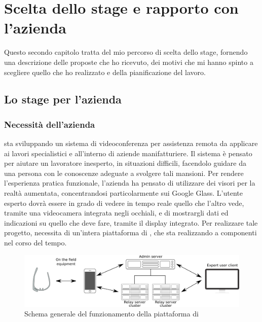 \chapter{Scelta dello stage e rapporto con l'azienda}
Questo secondo capitolo tratta del mio percorso di scelta dello stage, fornendo una descrizione delle proposte che ho ricevuto, dei motivi che mi hanno spinto a scegliere quello che ho realizzato e della pianificazione del lavoro.

\section{Lo stage per l'azienda}

   \subsection{Necessità dell'azienda}
   \nomeAzienda{} sta sviluppando un sistema di videoconferenza per assistenza remota da applicare ai lavori specialistici e all'interno di aziende manifatturiere. Il sistema è pensato per aiutare un lavoratore inesperto, in situazioni difficili, facendolo guidare da una persona con le conoscenze adeguate a svolgere tali mansioni. Per rendere l'esperienza pratica funzionale, l'azienda ha pensato di utilizzare dei visori per la realtà aumentata, concentrandosi particolarmente sui Google Glass. L'utente esperto dovrà essere in grado di vedere in tempo reale quello che l'altro vede, tramite una videocamera integrata negli occhiali, e di mostrargli dati ed indicazioni su quello che deve fare, tramite il display integrato. Per realizzare tale progetto, \nomeAzienda{} necessita di un'intera piattaforma di , che sta realizzando a componenti nel corso del tempo.
   \begin{figure}[H]
      \begin{center}
         \includegraphics[width=16.5cm,keepaspectratio]{immagini/erastreaming-schema}
         \caption{Schema generale del funzionamento della piattaforma di }
      \end{center}
   \end{figure}
